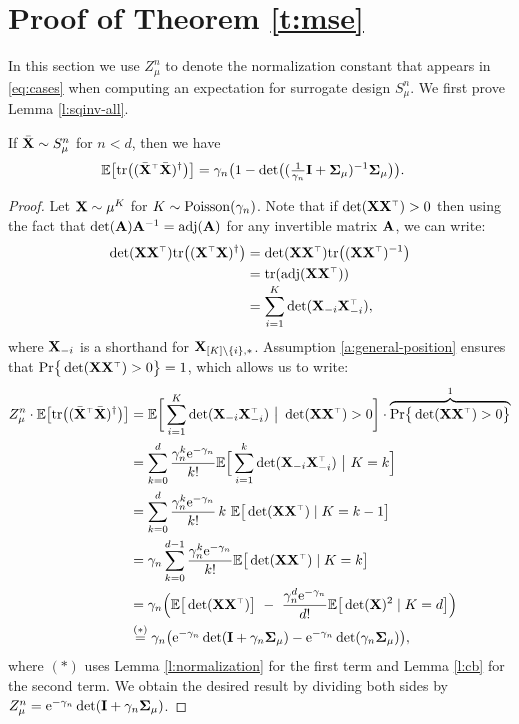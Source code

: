 \section{Proof of Theorem \ref{t:mse}}
\label{a:mse-proof}
In this section we use $Z_\mu^n$ to denote the normalization
constant that appears in \eqref{eq:cases} when computing an expectation for surrogate design
$S_\mu^n$.
We first prove Lemma \ref{l:sqinv-all}. %
\begin{lemma}\label{l:sqinv-under}
If  ${\bar{\mathbf X}}\sim S_\mu^n$ for $n<d$, then we have
\begin{align*}
    \E\big[\tr\big((\Xb^\top\Xb)^{\dagger}\big)\big]
    &={\gamma_n}\big(1- \det\!\big((\tfrac1{\gamma_n}\I+\Sigmab_\mu)^{-1}\Sigmab_\mu\big)\big).
\end{align*}
\end{lemma}
\begin{proof}
Let $\mathbf X\sim\mu^K$ for $K\sim{\operatorname{Poisson}}({\gamma_n})$. Note that if
$\det(\X\X^\top)>0$ then using the fact that
$\det(\mathbf A)\mathbf A^{-1}=\operatorname{\textnormal{adj}}(\mathbf A)$ for any invertible matrix $\mathbf A$, we can write:
  \begin{align*}
    \det(\X\X^\top)\tr\big((\X^\top\X)^{\dagger}\big)
    &= \det(\X\X^\top)\tr\big((\X\X^\top)^{-1}\big) \\
    &= \tr(\adj(\X\X^\top)) \\[-1mm]
    &= \sum_{i=1}^K\det(\X_{-i}\X_{-i}^\top),
  \end{align*}
  where $\mathbf X_{-i}$ is a shorthand for $\mathbf X_{[K]\backslash\{i\},*}$.
Assumption \ref{a:general-position} ensures that
$\Pr\big\{\det(\X\X^\top)>0\big\}=1$, which allows us to write:
  \begin{align*}
Z_\mu^n\cdot \E\big[\tr\big((\Xb^\top\Xb)^{\dagger}\big)\big]
    &=\E\bigg[
    \sum_{i=1}^K\det(\X_{-i}\X_{-i}^\top)\ \big|\
    \det(\X\X^\top)>0\bigg]\cdot\overbrace{\Pr\big\{\det(\X\X^\top)>0\big\}}^{1}\\
    &=\sum_{k=0}^d\frac{\gamma_n^{k}\ee^{-\gamma_n}}{k!}\E\Big[
      \sum_{i=1}^k\det(\X_{-i}\X_{-i}^\top)\ \big|\  K=k\Big]\\
    &=\sum_{k=0}^d\frac{\gamma_n^{k}\ee^{-\gamma_n}}{k!}\, k\
      \E\big[\det(\X\X^\top)\mid K=k-1\big]\\
    &=\gamma_n\sum_{k=0}^{d-1}\frac{\gamma_n^{k}\ee^{-\gamma_n}}{k!}
      \E\big[\det(\X\X^\top)\mid K=k\big]\\
    &=\gamma_n\Big(\E\big[\det(\X\X^\top)\big]\ -\
      \frac{\gamma_n^{d}\ee^{-\gamma_n}}{d!}\E\big[\det(\X)^2\mid K=d\big]
      \Big) \\
    &\overset{(*)}{=}\gamma_n\big(\ee^{-\gamma_n}\det(\I +\gamma_n\Sigmab_\mu) -
      \ee^{-\gamma_n}\det(\gamma_n\Sigmab_\mu)\big),
  \end{align*}
  where $(*)$ uses Lemma \ref{l:normalization} for the first term and
  Lemma \ref{l:cb} for the second term. We obtain the desired result by
  dividing both sides by
  $Z_\mu^n=\mathrm{e}^{-\gamma_n}\det(\mathbf I+\gamma_n\mathbf{\Sigma}_\mu)$.
\end{proof}
